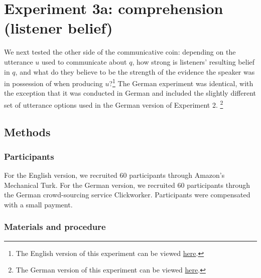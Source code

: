 \documentclass[11pt]{article}
\begin{document}
\section{Experiment 3a: comprehension (listener belief)}


We next tested the other side of the communicative coin: depending on the utterance $u$ used to communicate about $q$, how strong is listeners' resulting belief in $q$, and what do they believe to be the strength of the evidence the speaker was in possession of when producing $u$?\footnote{The English version of this experiment can be viewed \href{http://stanford.edu/~jdegen/72_modals_comprehension_evidence_room/modals.html}{here}.} The German experiment was identical, with the exception that it was conducted in German and included the slightly different set of utterance options used in the German version of Experiment 2. \footnote{The German version of this experiment can be viewed \href{http://web.stanford.edu/~jdegen/cgi-bin/2_dp_comprehension_listenerbelief/modals.html}{here}.}

\subsection{Methods}

\subsubsection{Participants}

For the English version, we recruited 60 participants through Amazon's Mechanical Turk. 
For the German version, we recruited 60 participants through the German crowd-sourcing service Clickworker. Participants were compensated with a small payment.

\subsubsection{Materials and procedure}
\end{document}
